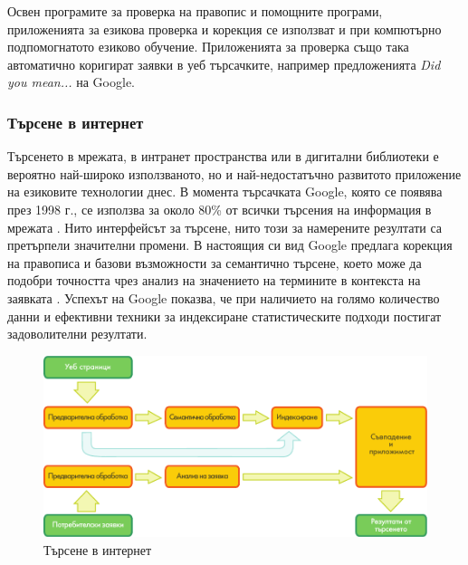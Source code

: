 \begin{multicols}{2}

  Освен програмите за проверка на правопис и помощните програми, приложенията за езикова проверка и корекция се използват и при компютърно подпомогнатото езиково обучение. Приложенията за проверка също така автоматично коригират заявки в уеб търсачките, например предложенията \textit{Did you mean...} на Google.

  \subsubsection{Търсене в интернет}

  Търсенето в мрежата, в интранет пространства или в дигитални библиотеки е вероятно най-широко използваното, но и най-недостатъчно развитото приложение на езиковите технологии днес. 
  В момента търсачката Google, която се
   появява през 1998 г., се използва за около 80\% от всички търсения на информация в мрежата \cite{spi1}. 
  Нито интерфейсът за търсене, нито този за
   намерените резултати са претърпели значителни
   промени. В настоящия си
   вид Google предлага корекция на правописа и
  базови възможности за семантично търсене, което може да подобри
   точността чрез анализ на значението на
   термините в контекста на заявката  \cite{pc1}. Успехът на Google
   показва, че при наличието на голямо количество данни и ефективни
   техники за индексиране статистическите
   подходи постигат задоволителни резултати.

  \begin{figure}[htb]
    \center
    \includegraphics[width=\textwidth]{../_media/bulgarian/web_search_architecture}
    \vspace{-5mm}
    \caption{Търсене в интернет}
    \label{fig:websearcharch_de}
  \end{figure}


\end{multicols}
